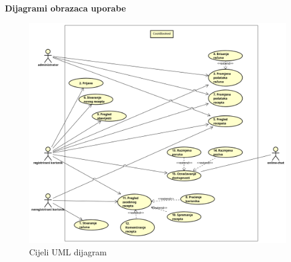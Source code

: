 						
						
					
					\eject
					\noindent \textbf{Dijagrami obrazaca uporabe}
					
					\begin{figure}[H]
						\centering
						\includegraphics[width=1.1\linewidth]{"slike/dijagrami/UML cijeli"}
						\caption{Cijeli UML dijagram}
						\label{fig:uml-cijeli}
					\end{figure}
				
